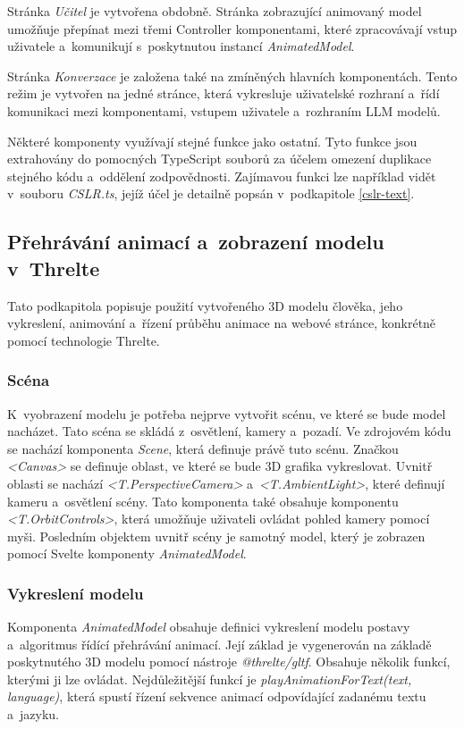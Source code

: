 \documentclass[
  master,
  program=ainfvs,
  biblatex,
  figures=true,
  tables=false,
  sourcecodes=true,
  glossaries,
  index
]{kidiplom}
\begin{document}
        Stránka \emph{Učitel} je vytvořena obdobně. Stránka zobrazující animovaný model umožňuje přepínat mezi třemi Controller komponentami, které zpracovávají vstup uživatele a~komunikují s~poskytnutou instancí \emph{AnimatedModel}.

        Stránka \emph{Konverzace} je založena také na zmíněných hlavních komponentách. Tento režim je vytvořen na jedné stránce, která vykresluje uživatelské rozhraní a~řídí komunikaci mezi komponentami, vstupem uživatele a~rozhraním LLM modelů.

        Některé komponenty využívají stejné funkce jako ostatní. Tyto funkce jsou extrahovány do pomocných TypeScript souborů za účelem omezení duplikace stejného kódu a~oddělení zodpovědnosti. Zajímavou funkci lze například vidět v~souboru \emph{CSLR.ts}, jejíž účel je detailně popsán v~podkapitole \ref{cslr-text}.


    \subsection{Přehrávání animací a~zobrazení modelu v~Threlte}
        Tato podkapitola popisuje použití vytvořeného 3D modelu člověka, jeho vykreslení, animování a~řízení průběhu animace na webové stránce, konkrétně pomocí technologie Threlte.
        
        \subsubsection{Scéna}
            K~vyobrazení modelu je potřeba nejprve vytvořit scénu, ve které se bude model nacházet. Tato scéna se skládá z~osvětlení, kamery a~pozadí. Ve zdrojovém kódu se nachází komponenta \emph{Scene}, která definuje právě tuto scénu.
            Značkou \emph{<Canvas>} se definuje oblast, ve které se bude 3D grafika vykreslovat. Uvnitř oblasti se nachází \emph{<T.PerspectiveCamera>} a~\emph{<T.AmbientLight>}, které definují kameru a~osvětlení scény. Tato komponenta také obsahuje komponentu \emph{<T.OrbitControls>}, která umožňuje uživateli ovládat pohled kamery pomocí myši. Posledním objektem uvnitř scény je samotný model, který je zobrazen pomocí Svelte komponenty \emph{AnimatedModel}.

        \subsubsection{Vykreslení modelu}
            Komponenta \emph{AnimatedModel} obsahuje definici vykreslení modelu postavy a~algoritmus řídící přehrávání animací. Její základ je vygenerován na základě poskytnutého 3D modelu pomocí nástroje \emph{@threlte/gltf}. Obsahuje několik funkcí, kterými ji lze ovládat. Nejdůležitější funkcí je \emph{playAnimationForText(text, language)}, která spustí řízení sekvence animací odpovídající zadanému textu a~jazyku.
\end{document}
